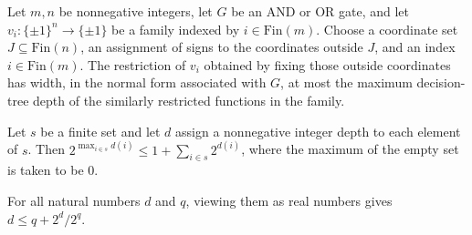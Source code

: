\begin{theorem}
\label{FABL.CircuitGate.hasWidthLE_extendedSignRestriction_max}
\leanok
{}
Let $m,n$ be nonnegative integers, let $G$ be an AND or OR gate, and let
$v_i:\{\pm1\}^n\to\{\pm1\}$ be a family indexed by $i\in\text{Fin}(m)$. Choose a
coordinate set $J\subseteq\text{Fin}(n)$, an assignment of signs to the coordinates
outside $J$, and an index $i\in\text{Fin}(m)$. The restriction of $v_i$ obtained by
fixing those outside coordinates has width, in the normal form associated with $G$, at
most the maximum decision-tree depth of the similarly restricted functions in the
family.
\end{theorem}

\begin{theorem}
\label{FABL.two_pow_sup_le_one_add_sum}
\leanok
{}
Let $s$ be a finite set and let $d$ assign a nonnegative integer depth to each element
of $s$. Then $2^{\max_{i\in s}d(i)}\le 1+\sum_{i\in s}2^{d(i)}$, where the maximum of
the empty set is taken to be $0$.
\end{theorem}

\begin{theorem}
\label{FABL.natCast_le_add_pow_div_pow}
\leanok
{}
For all natural numbers $d$ and $q$, viewing them as real numbers gives $d\le
q+2^d/2^q$.
\end{theorem}

